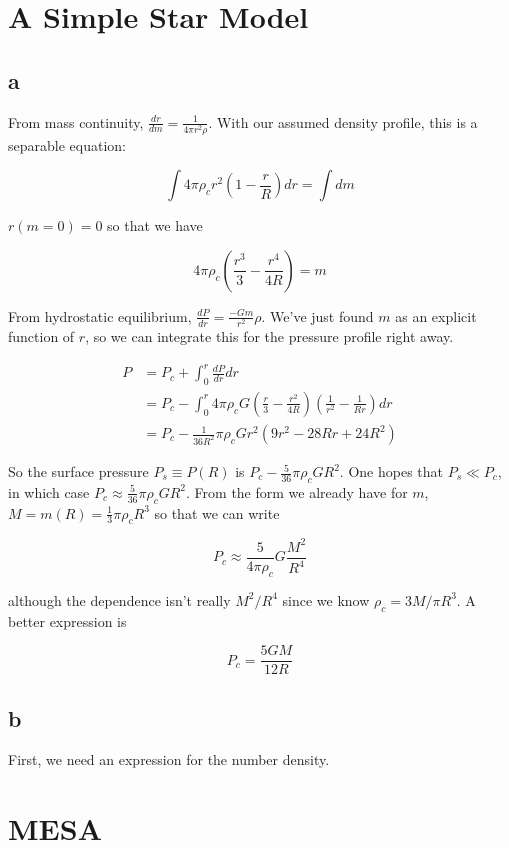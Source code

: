 \documentclass[12pt]{article}
\begin{document}
\section{A Simple Star Model}

\subsection*{a}

From mass continuity, \(\frac{dr}{dm} = \frac{1}{4\pi r^2 \rho}\). With our assumed density profile, this is a separable equation:

\[ \int 4\pi \rho_c r^2\left(1-\frac{r}{R}\right)dr = \int dm
\]

\(r(m=0) = 0\) so that we have

\[ 4\pi \rho_c \left( \frac{r^3}{3} - \frac{r^4}{4R} \right) = m
\]

From hydrostatic equilibrium, \(\frac{dP}{dr} = \frac{-Gm}{r^2}\rho\). We've just found \(m\) as an explicit function of \(r\), so we can integrate this for the pressure profile right away.

\begin{align*}
P &= P_c + \int_0^r \frac{dP}{dr}dr \\[12pt]
&= P_c - \int_0^r 4\pi\rho_c G \left(  \frac{r}{3} - \frac{r^2}{4R} \right)\left( \frac{1}{r^2} - \frac{1}{Rr} \right)dr \\[12pt]
&= P_c - \frac{1}{36R^2} \pi\rho_c G r^2\left( 9r^2 -28Rr + 24R^2 \right)
\end{align*}

So the surface pressure \( P_s \equiv P(R)\) is \(P_c - \frac{5}{36}\pi\rho_c G R^2\). One hopes that \(P_s \ll P_c\), in which case \(P_c \approx \frac{5}{36}\pi\rho_cG R^2\). From the form we already have for \(m\), \(M = m(R) = \frac{1}{3}\pi\rho_c R^3 \) so that we can write

\[ P_c \approx \frac{5}{4\pi\rho_c}G\frac{M^2}{R^4}
\]

although the dependence isn't really \(M^2/R^4\) since we know \(\rho_c = 3M/\pi R^3\). A better expression is

\[ P_c = \frac{5GM}{12R}\]

\subsection*{b}

First, we need an expression for the number density. 

\section{MESA}
\end{document}
